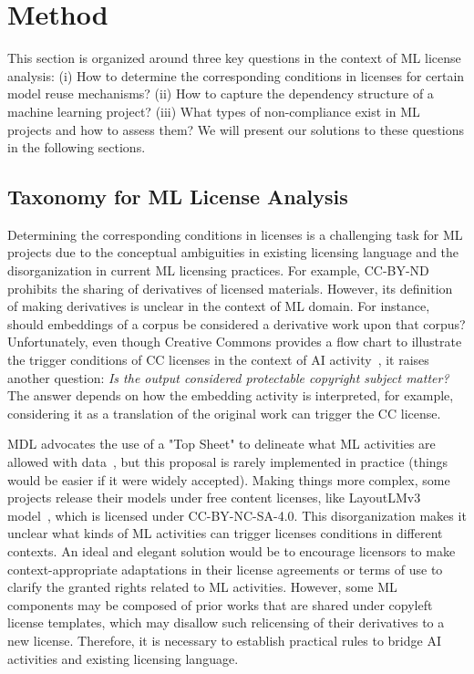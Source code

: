 \section{Method}
This section is organized around three key questions in the context of ML license analysis: (i) How to determine the corresponding conditions in licenses for certain model reuse mechanisms? (ii) How to capture the dependency structure of a machine learning project? (iii) What types of non-compliance exist in ML projects and how to assess them?
We will present our solutions to these questions in the following sections.

\subsection{Taxonomy for ML License Analysis}
Determining the corresponding conditions in licenses is a challenging task for ML projects due to the conceptual ambiguities in existing licensing language and the disorganization in current ML licensing practices.
For example, CC-BY-ND prohibits the sharing of derivatives of licensed materials.
However, its definition of making derivatives is unclear in the context of ML domain.
For instance, should embeddings of a corpus be considered a derivative work upon that corpus?
Unfortunately, even though Creative Commons provides a flow chart to illustrate the trigger conditions of CC licenses in the context of AI activity~\cite{creative2023artificial}, it raises another question: \textit{Is the output considered protectable copyright subject matter?}
The answer depends on how the embedding activity is interpreted, for example, considering it as a translation of the original work can trigger the CC license.

MDL advocates the use of a "Top Sheet" to delineate what ML activities are allowed with data~\cite{benjamin2019towards}, but this proposal is rarely implemented in practice (things would be easier if it were widely accepted). 
Making things more complex, some projects release their models under free content licenses, like LayoutLMv3 model~\cite{huang2022layoutlmv3}, which is licensed under CC-BY-NC-SA-4.0. 
This disorganization makes it unclear what kinds of ML activities can trigger licenses conditions in different contexts.
An ideal and elegant solution would be to encourage licensors to make context-appropriate adaptations in their license agreements or terms of use to clarify the granted rights related to ML activities. 
However, some ML components may be composed of prior works that are shared under copyleft license templates, which may disallow such relicensing of their derivatives to a new license.
Therefore, it is necessary to establish practical rules to bridge AI activities and existing licensing language.

